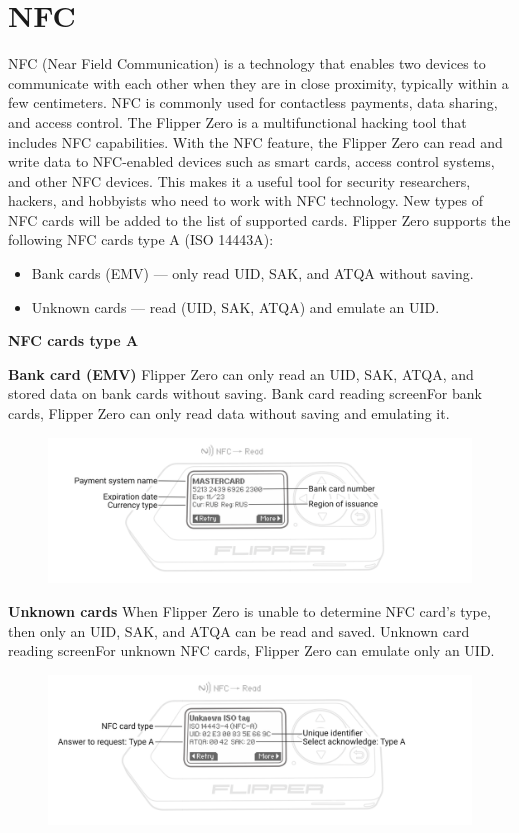 \documentclass[a4paper,11pt]{report}
\begin{document}
\section{NFC}
NFC (Near Field Communication) is a technology that enables two devices to communicate with each other when they are in close proximity, typically within a few centimeters. NFC is commonly used for contactless payments, data sharing, and access control.
The Flipper Zero is a multifunctional hacking tool that includes NFC capabilities. With the NFC feature, the Flipper Zero can read and write data to NFC-enabled devices such as smart cards, access control systems, and other NFC devices. This makes it a useful tool for security researchers, hackers, and hobbyists who need to work with NFC technology. New types of NFC cards will be added to the list of supported cards. Flipper Zero supports the following NFC cards type A (ISO 14443A):
\begin{itemize}
  \item Bank cards (EMV) — only read UID, SAK, and ATQA without saving.
  \item Unknown cards — read (UID, SAK, ATQA) and emulate an UID.
\end{itemize}
\textbf{NFC cards type A}

\textbf{Bank card (EMV)} Flipper Zero can only read an UID, SAK, ATQA, and stored data on bank cards without saving. Bank card reading screenFor bank cards, Flipper Zero can only read data without saving and emulating it.
\begin{figure}[h]
	\centering
	\hspace{21pt}
	\includegraphics[width=.70\linewidth]{Bank_card.png}
	\label{fig:type.png}
\end{figure}

\textbf{Unknown cards} When Flipper Zero is unable to determine NFC card's type, then only an UID, SAK, and ATQA can be read and saved. Unknown card reading screenFor unknown NFC cards, Flipper Zero can emulate only an UID.

\begin{figure}[h]
	\centering
	\hspace{21pt}
	\includegraphics[width=.70\linewidth]{Unknown_card.png}
	\label{fig:type.png}
\end{figure}
\end{document}
